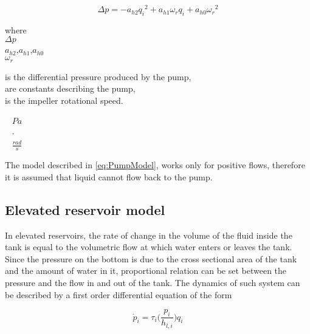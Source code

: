 \begin{equation}
  \Delta p = -a_{h2}{q_i}^2 + a_{h1} \omega_r q_i + a_{h0}{\omega_r}^2
  \label{eq:PumpModel}
\end{equation}

\begin{minipage}[t]{0.20\textwidth}
where\\
\hspace*{8mm} $\Delta p$ \\
\hspace*{8mm} $a_{h2}$,$a_{h1}$,$a_{h0}$ \\
\hspace*{8mm} $\omega_r$ 

\end{minipage}
\begin{minipage}[t]{0.68\textwidth}
\vspace*{2mm}
is the differential pressure produced by the pump,\\
are constants describing the pump,\\
is the impeller rotational speed.
\end{minipage}
\begin{minipage}[t]{0.10\textwidth}
\vspace*{2mm}
\textcolor{White}{te}$\unit{Pa}$\\
\textcolor{White}{te}$\unit{\cdot}$\\
\textcolor{White}{te}$\unit{\frac{rad}{s}}$
\end{minipage}  

The model described in \eqref{eq:PumpModel}, works only for positive flows, therefore it is assumed that liquid cannot flow back to the pump. 

\subsection{Elevated reservoir model}
\label{elevatedreservoir_component}

In elevated reservoirs, the rate of change in the volume of the fluid inside the tank is equal to the volumetric flow at which water enters or leaves the tank. Since the pressure on the bottom is due to the cross sectional area of the tank and the amount of water in it, proportional relation can be set between the pressure and the flow in and out of the tank. The dynamics of such system can be described by a first order differential equation of the form

\begin{equation}
\label{wt_model}
\dot{p}_i = \tau_i\Big(\frac{p_i}{h_{l,i}}\Big) q_i
\end{equation}

